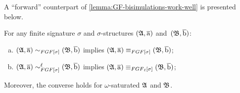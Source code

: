 A ``forward'' counterpart of \cref{lemma:GF-bisimulations-work-well} is presented below.
\begin{lemma}\label{lemma:FGF-bisimulations-work-well}
For any finite signature $\sigma$ and $\sigma$-structures $({\mathfrak{A}}, \overline{\mathrm{a}})$ and~$({\mathfrak{B}}, \overline{\mathrm{b}})$:
\begin{enumerate}[(a)]
\item $(\str{A}, \elemtuplea) \bisimto_{\FGF[\sigma]} (\str{B}, \elemtupleb)$ implies $(\str{A}, \elemtuplea) \equiv_{\FGF[\sigma]} (\str{B}, \elemtupleb)$;
\item $(\str{A}, \elemtuplea) \bisimto_{\FGF[\sigma]}^{\ell} (\str{B}, \elemtupleb)$ implies $(\str{A}, \elemtuplea) \equiv_{\FGF_\ell[\sigma]} (\str{B}, \elemtupleb)$;
\end{enumerate}
Moreover, the converse holds for $\omega$-saturated ${\mathfrak{A}}$ and ${\mathfrak{B}}$.
\end{lemma}
